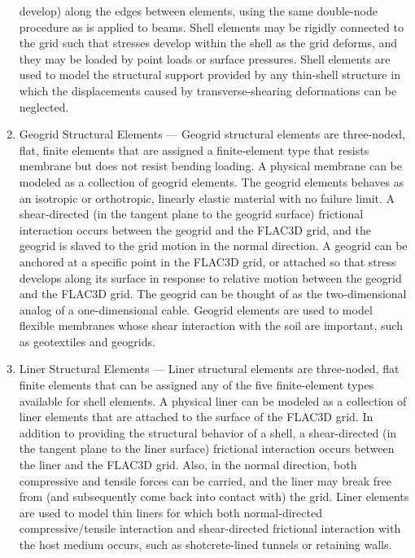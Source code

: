 \documentclass[a4paper, nobind]{templates/ociamthesis}
\begin{document}
\begin{enumerate}
  develop) along the edges between elements, using the same
  double-node procedure as is applied to beams. Shell elements may be
  rigidly connected to the grid such that stresses develop within the
  shell as the grid deforms, and they may be loaded by point loads or
  surface pressures. Shell elements are used to model the structural
  support provided by any thin-shell structure in which the
  displacements caused by transverse-shearing deformations can be
  neglected.
\item
  Geogrid Structural Elements --- Geogrid structural elements are
  three-noded, flat, finite elements that are assigned a
  finite-element type that resists membrane but does not resist
  bending loading. A physical membrane can be modeled as a collection
  of geogrid elements. The geogrid elements behaves as an isotropic or
  orthotropic, linearly elastic material with no failure limit. A
  shear-directed (in the tangent plane to the geogrid surface)
  frictional interaction occurs between the geogrid and the FLAC3D
  grid, and the geogrid is slaved to the grid motion in the normal
  direction. A geogrid can be anchored at a specific point in the
  FLAC3D grid, or attached so that stress develops along its surface
  in response to relative motion between the geogrid and the FLAC3D
  grid. The geogrid can be thought of as the two-dimensional analog of
  a one-dimensional cable. Geogrid elements are used to model flexible
  membranes whose shear interaction with the soil are important, such
  as geotextiles and geogrids.
\item
  Liner Structural Elements --- Liner structural elements are
  three-noded, flat finite elements that can be assigned any of the
  five finite-element types available for shell elements. A physical
  liner can be modeled as a collection of liner elements that are
  attached to the surface of the FLAC3D grid. In addition to providing
  the structural behavior of a shell, a shear-directed (in the tangent
  plane to the liner surface) frictional interaction occurs between
  the liner and the FLAC3D grid. Also, in the normal direction, both
  compressive and tensile forces can be carried, and the liner may
  break free from (and subsequently come back into contact with) the
  grid. Liner elements are used to model thin liners for which both
  normal-directed compressive/tensile interaction and shear-directed
  frictional interaction with the host medium occurs, such as
  shotcrete-lined tunnels or retaining walls.
\end{enumerate}
\end{document}
